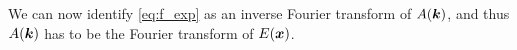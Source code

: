 \documentclass[11pt,a4paper, 
swedish,english %
]{article}
\begin{document}
We can now identify \eqref{eq:f_exp} as an inverse Fourier transform of $A(\vb*k)$, and thus $A(\vb*k)$ has to be the Fourier transform of $E(\vb*x)$.

\end{document}
